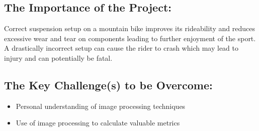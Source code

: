 \documentclass[a4paper, 12pt]{article}
\begin{document}
	\subsection[Importance]{The Importance of the Project:}
	Correct suspension setup on a mountain bike improves its rideability and reduces excessive wear and tear on components leading to further enjoyment of the sport. A drastically incorrect setup can cause the rider to crash which may lead to injury and can potentially be fatal.
	
	\subsection[Challenges]{The Key Challenge(s) to be Overcome:}
	\begin{itemize}
		\item Personal understanding of image processing techniques
		\item Use of image processing to calculate valuable metrics
	\end{itemize}
\end{document}
